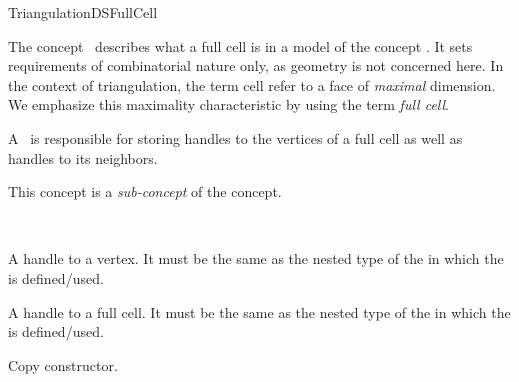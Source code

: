 \begin{ccRefConcept}{TriangulationDSFullCell}

\ccDefinition

The concept \ccRefName\ describes what a full cell is in a model of the concept
. It sets requirements of combinatorial nature
only, as geometry is not concerned here.
In the context of triangulation, the term cell refer to a face of
\emph{maximal} dimension. We emphasize this maximality characteristic by using
the term {\em full cell}.

A \ccRefName\ is responsible for storing handles to the vertices of a
full cell as well as handles to its neighbors.

This concept is a \emph{sub-concept} of the 
concept.

\ccHasModels

\\

\ccTypes

{A handle to a vertex. It must be the same as the
nested type  of the  in which the
 is defined/used.}


{A handle to a full cell. It must be the same as the
nested type  of the  in which the
 is defined/used.}



\ccCreation	
{}


%
{Copy constructor.}


\end{ccRefConcept}
